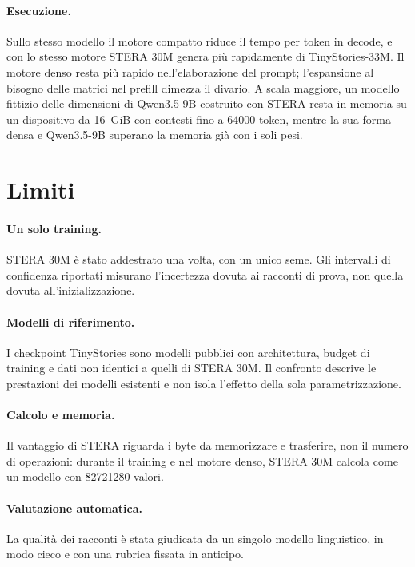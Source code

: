 \paragraph{Esecuzione.} Sullo stesso modello il motore compatto riduce il tempo per token in decode, e con lo stesso motore STERA 30M genera più rapidamente di TinyStories-33M. Il motore denso resta più rapido nell'elaborazione del prompt; l'espansione al bisogno delle matrici nel prefill dimezza il divario. A scala maggiore, un modello fittizio delle dimensioni di Qwen3.5-9B costruito con STERA resta in memoria su un dispositivo da 16~GiB con contesti fino a \num{64000} token, mentre la sua forma densa e Qwen3.5-9B superano la memoria già con i soli pesi.

\section{Limiti}

\paragraph{Un solo training.} STERA 30M è stato addestrato una volta, con un unico seme. Gli intervalli di confidenza riportati misurano l'incertezza dovuta ai racconti di prova, non quella dovuta all'inizializzazione.

\paragraph{Modelli di riferimento.} I checkpoint TinyStories sono modelli pubblici con architettura, budget di training e dati non identici a quelli di STERA 30M. Il confronto descrive le prestazioni dei modelli esistenti e non isola l'effetto della sola parametrizzazione.

\paragraph{Calcolo e memoria.} Il vantaggio di STERA riguarda i byte da memorizzare e trasferire, non il numero di operazioni: durante il training e nel motore denso, STERA 30M calcola come un modello con \num{82721280} valori.

\paragraph{Valutazione automatica.} La qualità dei racconti è stata giudicata da un singolo modello linguistico, in modo cieco e con una rubrica fissata in anticipo.

